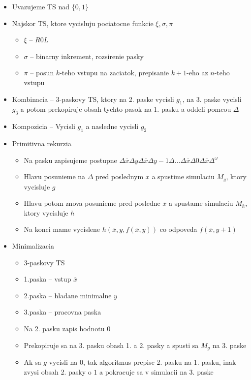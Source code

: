 \documentclass[12pt]{article}
\begin{document}
\begin{itemize}
	\item Uvazujeme TS nad $\{0,1\}$
	\item Najskor TS, ktore vycisluju pociatocne funkcie $\xi,\sigma,\pi$
		\begin{itemize}
			\item $\xi$ -- $R0L$
			\item $\sigma$ -- binarny inkrement, rozsirenie pasky
			\item $\pi$ -- posun $k$-teho vstupu na zaciatok, prepisanie $k+1$-eho az $n$-teho vstupu
		\end{itemize}
	\item Kombinacia -- 3-paskovy TS, ktory na 2. paske vycisli $g_{1}$, na 3. paske vycisli $g_{3}$
		a potom prekopiruje obsah tychto pasok na 1. pasku a oddeli pomcou $\Delta$
	\item Kompozicia -- Vycisli $g_{1}$ a nasledne vycisli $g_{2}$
	\item Primitivna rekurzia
		\begin{itemize}
			\item Na pasku zapisujeme postupne
				$\Delta\overline{x}\Delta y\Delta\overline{x}\Delta y-1\Delta...\Delta\overline{x}\Delta0\Delta\overline{x}\Delta^{\omega}$
			\item Hlavu posunieme na $\Delta$ pred poslednym $\overline{x}$ a spustime simulaciu $M_{g}$, ktory vycisluje $g$
			\item Hlavu potom znova posunieme pred posledne $\overline{x}$ a spustame simulaciu $M_{h}$, ktory vycisluje $h$
			\item Na konci mame vycislene $h(\overline{x},y,f(\overline{x},y))$ co odpoveda $f(\overline{x},y+1)$
		\end{itemize}
	\item Minimalizacia
		\begin{itemize}
			\item 3-paskovy TS
			\item 1.paska -- vstup $\overline{x}$
			\item 2.paska -- hladane minimalne $y$
			\item 3.paska -- pracovna paska
			\item Na 2. pasku zapis hodnotu $0$
			\item Prekopiruje sa na 3. pasku obash 1. a 2. pasky a spusti sa $M_{g}$ na 3. paske
			\item Ak sa $g$ vycisli na $0$, tak algoritmus prepise 2. pasku na 1. pasku, inak zvysi obsah 2. pasky o $1$
				a pokracuje sa v simulacii na 3. paske
		\end{itemize}
\end{itemize}
\end{document}
